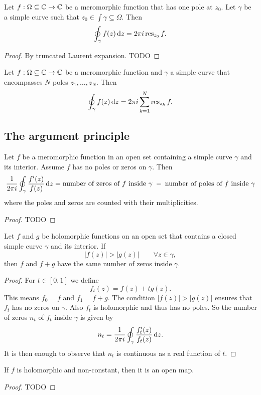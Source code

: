 \begin{proposition}
Let $f: \Omega\subseteq \mathbb{C}\to \mathbb{C}$ be a meromorphic function that has one pole at $z_0$. Let $\gamma$ be a simple curve such that $z_0\in \int\gamma \subseteq \Omega$. Then
\[ \oint_\gamma f(z) \operatorname{d \!}{z} = 2\pi i \operatorname{res}_{z_0}f. \]
\end{proposition}
\begin{proof}
By truncated Laurent expansion. TODO
\end{proof}
\begin{corollary}
Let $f: \Omega\subseteq \mathbb{C}\to \mathbb{C}$ be a meromorphic function and $\gamma$ a simple curve that encompasses $N$ poles $z_1, \ldots, z_N$. Then
\[ \oint_{\gamma} f(z)\operatorname{d \!}{z} = 2\pi i \sum_{k=1}^N\operatorname{res}_{z_k}f. \]
\end{corollary}

\subsection{The argument principle}
\begin{proposition}
Let $f$ be a meromorphic function in an open set containing a simple curve $\gamma$ and its interior. Assume $f$ has no poles or zeros on $\gamma$. Then
\[ \frac{1}{2\pi i}\oint_\gamma \frac{f'(z)}{f(z)}\operatorname{d \!}{z} = \text{number of zeros of $f$ inside $\gamma$} \;-\; \text{number of poles of $f$ inside $\gamma$} \]
where the poles and zeros are counted with their multiplicities.
\end{proposition}
\begin{proof}
TODO
\end{proof}

\begin{theorem}
Let $f$ and $g$ be holomorphic functions on an open set that contains a closed simple curve $\gamma$ and its interior. If
\[ |f(z)| > |g(z)| \qquad \forall z\in \gamma, \]
then $f$ and $f+g$ have the same number of zeros inside $\gamma$.
\end{theorem}
\begin{proof}
For $t\in [0, 1]$ we define
\[ f_t(z) = f(z) + tg(z). \]
This means $f_0 = f$ and $f_1 = f+g$. The condition $|f(z)| > |g(z)|$ ensures that $f_t$ has no zeros on $\gamma$. Also $f_t$ is holomorphic and thus has no poles. So the number of zeros $n_t$ of $f_t$ inside $\gamma$ is given by
\[ n_t = \frac{1}{2\pi i}\oint_\gamma \frac{f_t'(z)}{f_t(z)}\operatorname{d \!}{z}. \]
It is then enough to observe that $n_t$ is continuous as a real function of $t$.
\end{proof}
\begin{corollary}
If $f$ is holomorphic and non-constant, then it is an open map.
\end{corollary}
\begin{proof}
TODO
\end{proof}

